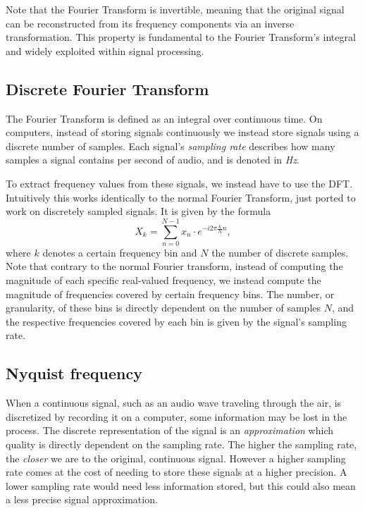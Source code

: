 Note that the Fourier Transform is invertible, meaning that the original signal can be reconstructed from its frequency components via an inverse transformation. This property is fundamental to the Fourier Transform's integral and widely exploited within signal processing.

\subsection{Discrete Fourier Transform}

The Fourier Transform is defined as an integral over continuous time. On computers, instead of storing signals continuously we instead store signals using a discrete number of samples. Each signal's \textit{sampling rate} describes how many samples a signal contains per second of audio, and is denoted in \textit{Hz}.

To extract frequency values from these signals, we instead have to use the \gls{DFT}. Intuitively this works identically to the normal Fourier Transform, just ported to work on discretely sampled signals. It is given by the formula \[ X_k = \sum^{N - 1}_{n=0}{x_n \cdot e^{-i 2\pi \frac{k}{N} n}}, \] where $k$ denotes a certain frequency bin and $N$ the number of discrete samples. Note that contrary to the normal Fourier transform, instead of computing the magnitude of each specific real-valued frequency, we instead compute the magnitude of frequencies covered by certain frequency bins. The number, or granularity, of these bins is directly dependent on the number of samples $N$, and the respective frequencies covered by each bin is given by the signal's sampling rate.

\subsection{Nyquist frequency}

When a continuous signal, such as an audio wave traveling through the air, is discretized by recording it on a computer, some information may be lost in the process. The discrete representation of the signal is an \textit{approximation} which quality is directly dependent on the sampling rate. The higher the sampling rate, the \textit{closer} we are to the original, continuous signal. However a higher sampling rate comes at the cost of needing to store these signals at a higher precision. A lower sampling rate would need less information stored, but this could also mean a less precise signal approximation.

